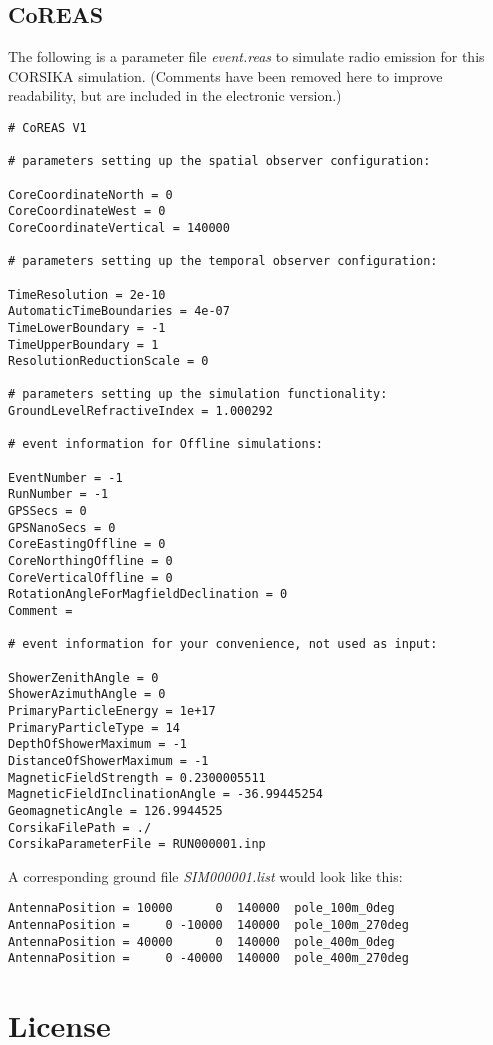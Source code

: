 \documentclass[a4paper,10pt]{article}
\begin{document}
\subsection{CoREAS}

The following is a parameter file {\it event.reas} to simulate radio emission for this CORSIKA simulation. (Comments have been removed here to improve readability, but are included in the electronic version.)
%
\begin{verbatim}
# CoREAS V1

# parameters setting up the spatial observer configuration:

CoreCoordinateNorth = 0
CoreCoordinateWest = 0
CoreCoordinateVertical = 140000

# parameters setting up the temporal observer configuration:

TimeResolution = 2e-10
AutomaticTimeBoundaries = 4e-07
TimeLowerBoundary = -1
TimeUpperBoundary = 1
ResolutionReductionScale = 0

# parameters setting up the simulation functionality:
GroundLevelRefractiveIndex = 1.000292

# event information for Offline simulations:

EventNumber = -1
RunNumber = -1
GPSSecs = 0
GPSNanoSecs = 0
CoreEastingOffline = 0
CoreNorthingOffline = 0
CoreVerticalOffline = 0
RotationAngleForMagfieldDeclination = 0
Comment =

# event information for your convenience, not used as input:

ShowerZenithAngle = 0
ShowerAzimuthAngle = 0
PrimaryParticleEnergy = 1e+17
PrimaryParticleType = 14
DepthOfShowerMaximum = -1
DistanceOfShowerMaximum = -1
MagneticFieldStrength = 0.2300005511
MagneticFieldInclinationAngle = -36.99445254
GeomagneticAngle = 126.9944525
CorsikaFilePath = ./
CorsikaParameterFile = RUN000001.inp
\end{verbatim}
%
A corresponding ground file {\it SIM000001.list} would look like this:
%
\begin{verbatim}
AntennaPosition = 10000      0  140000  pole_100m_0deg
AntennaPosition =     0 -10000  140000  pole_100m_270deg
AntennaPosition = 40000      0  140000  pole_400m_0deg
AntennaPosition =     0 -40000  140000  pole_400m_270deg
\end{verbatim}

\section{License} \label{sec:license}
\end{document}
